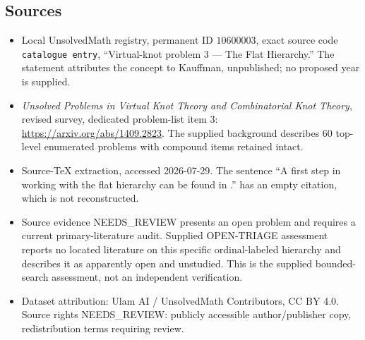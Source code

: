 \documentclass[11pt]{article}
\begin{document}
\subsection{Sources}
\begin{itemize}
\item Local UnsolvedMath registry, permanent ID \(10600003\), exact source code \texttt{catalogue entry}, ``Virtual-knot problem 3 --- The Flat Hierarchy.'' The statement attributes the concept to Kauffman, unpublished; no proposed year is supplied.
\item \emph{Unsolved Problems in Virtual Knot Theory and Combinatorial Knot Theory}, revised survey, dedicated problem-list item 3: \url{https://arxiv.org/abs/1409.2823}. The supplied background describes 60 top-level enumerated problems with compound items retained intact.
\item Source-TeX extraction, accessed 2026-07-29. The sentence ``A first step in working with the flat hierarchy can be found in .'' has an empty citation, which is not reconstructed.
\item Source evidence NEEDS\_REVIEW presents an open problem and requires a current primary-literature audit. Supplied OPEN-TRIAGE assessment reports no located literature on this specific ordinal-labeled hierarchy and describes it as apparently open and unstudied. This is the supplied bounded-search assessment, not an independent verification.
\item Dataset attribution: Ulam AI / UnsolvedMath Contributors, CC BY 4.0. Source rights NEEDS\_REVIEW: publicly accessible author/publisher copy, redistribution terms requiring review.
\end{itemize}
\end{document}
